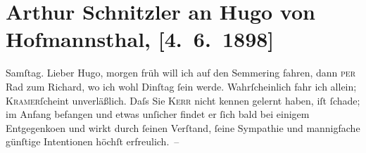 

         
         \renewcommand{\erwaehntePersonen}{Personen: Richard Beer-Hofmann, Otto Brahm, Hugo von Hofmannsthal, Alfred Kerr, Leopold Kramer}
         \renewcommand{\erwaehnteInstitutionen}{Institutionen: Deutsches Theater Berlin}
         \renewcommand{\erwaehnteOrte}{Orte: Hinterbrühl, Kärnten, Semmering, Steindorf am Ossiacher See, Wien}
         \renewcommand{\erwaehnteWerke}{}
               \section[Arthur Schnitzler an Hugo von Hofmannsthal, {[}4. 6. 1898{]}]{ Arthur Schnitzler an Hugo von Hofmannsthal, {[}4. 6. 1898{]}}\nopagebreak{}\rehead{ }\begin{ledgroupsized}[t]{13cm}\normalsize\beginnumbering \toendnotes[C]{\smallbreak\pagebreak[2]} 
\pstart
           \raggedleft{}{\pb}Samſtag.\pend
           \pstart
           Lieber Hugo, morgen früh will ich auf den Semmering fahren, dann \textsc{per} Rad zum Richard, wo ich wohl
                  Dinſtag{ }ſein werde. Wahrſcheinlich fahr ich allein; \textsc{Kramer}ſcheint {\pb}unverläßlich.
               Daſs Sie \textsc{Kerr} nicht kennen gelernt haben, iſt ſchade; im Anfang befangen und etwas unſicher
               findet er ſich bald bei einigem Entgegenko{\geminationm}en und wirkt
               durch ſeinen Verſtand, ſeine Sympathie und mannigfache {\pb}günſtige Intentionen höchſt erfreulich. –\pend
           \pstart

\end{ledgroupsized}
